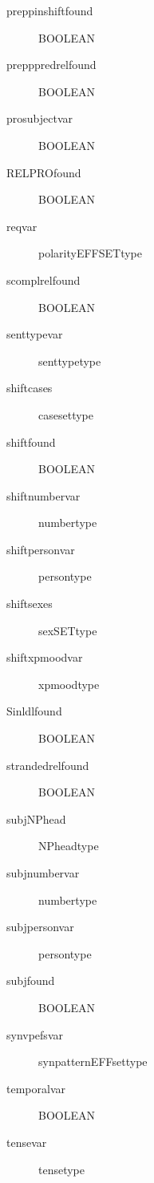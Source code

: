 \begin{description}
\item [preppinshiftfound  ] BOOLEAN\\
\item [prepppredrelfound  ] BOOLEAN\\
\item [prosubjectvar      ] BOOLEAN\\
\item [RELPROfound        ] BOOLEAN\\
\item [reqvar             ] polarityEFFSETtype\\
\item [scomplrelfound     ] BOOLEAN\\
\item [senttypevar        ] senttypetype\\
\item [shiftcases         ] casesettype\\
\item [shiftfound         ] BOOLEAN\\
\item [shiftnumbervar     ] numbertype\\
\item [shiftpersonvar     ] persontype\\
\item [shiftsexes         ] sexSETtype\\
\item [shiftxpmoodvar     ] xpmoodtype\\
\item [Sinldlfound        ] BOOLEAN\\
\item [strandedrelfound   ] BOOLEAN\\
\item [subjNPhead         ] NPheadtype\\
\item [subjnumbervar      ] numbertype\\
\item [subjpersonvar      ] persontype\\
\item [subjfound          ] BOOLEAN\\
\item [synvpefsvar        ] synpatternEFFsettype\\
\item [temporalvar        ] BOOLEAN\\
\item [tensevar           ] tensetype\\

\end{description}
